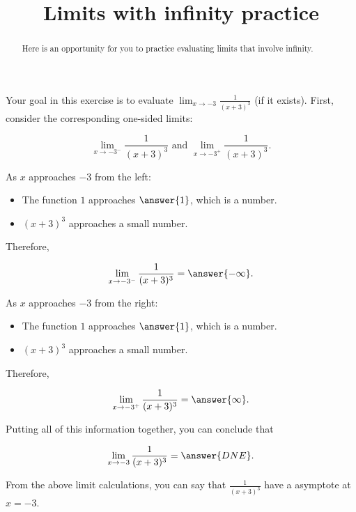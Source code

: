 \documentclass[handout]{ximera}
\title{Limits with infinity practice}
\begin{document}
\begin{abstract}
Here is an opportunity for you to practice evaluating limits that involve infinity.  
\end{abstract}
\maketitle

\begin{exercise}
Your goal in this exercise is to evaluate $\displaystyle\lim_{x \to -3} \frac{1}{(x+3)^3}$ (if it exists).  First, consider the corresponding one-sided limits:

$$\lim_{x \to -3^-} \frac{1}{(x+3)^3} \text{ and } \lim_{x \to -3^+} \frac{1}{(x+3)^3}.$$

As $x$ approaches $-3$ from the left:  

\begin{itemize}

\item The function $1$ approaches $\answer{1}$, which is a  number. 

\item $(x+3)^3$ approaches a small  number. 

\end{itemize}

Therefore, 

 \[ \lim_{x \to -3^-} \frac{1}{(x+3)^3} = \answer{-\infty}.\]
 
As $x$ approaches $-3$ from the right: 

\begin{itemize}

\item The function $1$ approaches $\answer{1}$, which is a  number. 

\item $(x+3)^3$ approaches a small  number. 

\end{itemize}

Therefore, 

 \[ \lim_{x \to -3^+} \frac{1}{(x+3)^3} = \answer{\infty}. \]

Putting all of this information together, you can conclude that

\[ \lim_{x \to -3} \frac{1}{(x+3)^3} = \answer{DNE}. \]

\begin{exercise}

From the above limit calculations, you can say that $\frac{1}{(x+3)^3}$  have a  asymptote at $x =-3$. 

\end{exercise}

\end{exercise}
\end{document}
